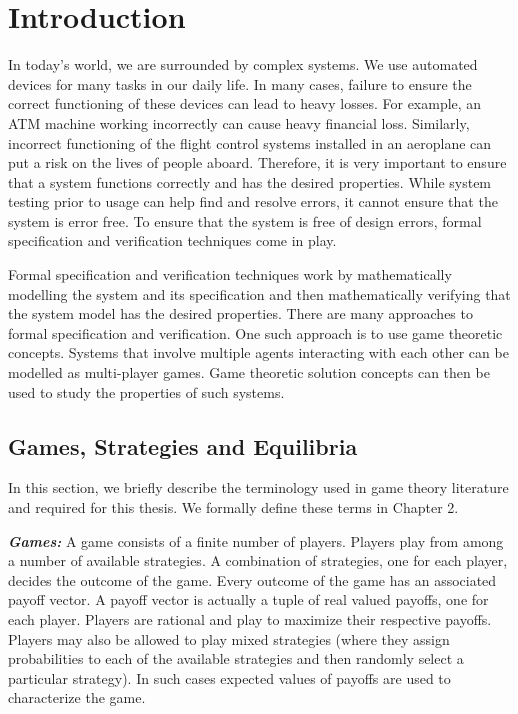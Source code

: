 \chapter{Introduction}

In today's world, we are surrounded by complex systems. We use automated devices for many tasks in our daily life. In many cases, failure to ensure the correct functioning of these devices can lead to heavy losses. For example, an ATM machine working incorrectly can cause heavy financial loss. Similarly, incorrect functioning of the flight control systems installed in an aeroplane can put a risk on the lives of people aboard. Therefore, it is very important to ensure that a system functions correctly and has the desired properties. While system testing prior to usage can help find and resolve errors, it cannot ensure that the system is error free. To ensure that the system is free of design errors, formal specification and verification techniques come in play.

Formal specification and verification techniques work by mathematically modelling the system and its specification and then mathematically verifying that the system model has the desired properties. There are many approaches to formal specification and verification. One such approach is to use game theoretic concepts. Systems that involve multiple agents interacting with each other can be modelled as multi-player games. Game theoretic solution concepts can then be used to study the properties of such systems.

\section{Games, Strategies and Equilibria}

In this section, we briefly describe the terminology used in game theory literature and required for this thesis. We formally define these terms in Chapter 2.

\textit{\textbf{Games:}} A game consists of a finite number of players. Players play from among a number of available strategies. A combination of strategies, one for each player, decides the outcome of the game. Every outcome of the game has an associated payoff vector. A payoff vector is actually a tuple of real valued payoffs, one for each player. Players are rational and play to maximize their respective payoffs. Players may also be allowed to play mixed strategies (where they assign probabilities to each of the available strategies and then randomly select a particular strategy). In such cases expected values of payoffs are used to characterize the game. 

